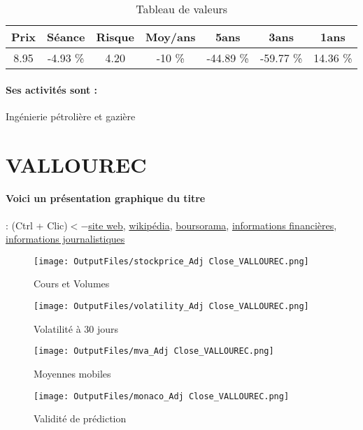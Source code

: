 \documentclass[11pt,a4paper]{report}%
\begin{document}
\begin{table}[H]
  \centering
    \begin{tabular}{|c|c|c|c|c|c|c|}
    \hline
    Prix & Séance & Risque  & Moy/ans & 5ans & 3ans & 1ans \\
    \hline
    8.95 &    -4.93 \%    & 4.20 & -10 \% & -44.89 \% & -59.77 \% & 14.36 \% \\
    \hline
    \end{tabular}%
        \label{tab:table_TECHNIPFMC}%
      \caption{Tableau de valeurs}
\end{table}%

\paragraph{Ses activités sont : } Ingénierie pétrolière et gazière 
    
    \newpage

\section{VALLOUREC}

\paragraph{Voici un présentation graphique du titre} : (Ctrl + Clic)$<-$\href{https://www.vallourec.com/fr/investisseurs/}{site web}, \href{https://fr.wikipedia.org/wiki/Vallourec}{wikipédia}, \href{https://www.boursorama.com/cours/1rPVK}{boursorama}, \href{https://www.qwant.com/?q=site:https:%2f%2fwww.easybourse.com%2faction-societe%2fVALLOUREC&t=web&client=ext-firefox-hp}{informations financières}, \href{https://bourse.lerevenu.com/cours-de-bourse/fiche-valeur-synthese/VALLOUREC/VK-FR}{informations journalistiques}
\begin{figure}[!htb]
   \begin{minipage}{0.5\textwidth}
     \centering
     \texttt{[image: OutputFiles/stockprice\_Adj Close\_VALLOUREC.png]}
     \caption{Cours et Volumes}\label{Fig:price_VALLOUREC}
   \end{minipage}\hfill
   \begin{minipage}{0.5\textwidth}
     \centering
     \texttt{[image: OutputFiles/volatility\_Adj Close\_VALLOUREC.png]}
     \caption{Volatilité à 30 jours}\label{Fig:volat_VALLOUREC}
   \end{minipage}
\end{figure}
\begin{figure}[!htb]
   \begin{minipage}{0.5\textwidth}
     \centering
     \texttt{[image: OutputFiles/mva\_Adj Close\_VALLOUREC.png]}
     \caption{Moyennes mobiles}\label{Fig:mva_VALLOUREC}
   \end{minipage}\hfill
   \begin{minipage}{0.5\textwidth}
     \centering
     \texttt{[image: OutputFiles/monaco\_Adj Close\_VALLOUREC.png]}
     \caption{Validité de prédiction}\label{Fig:prediction_VALLOUREC}
   \end{minipage}
\end{figure}
\end{document}
